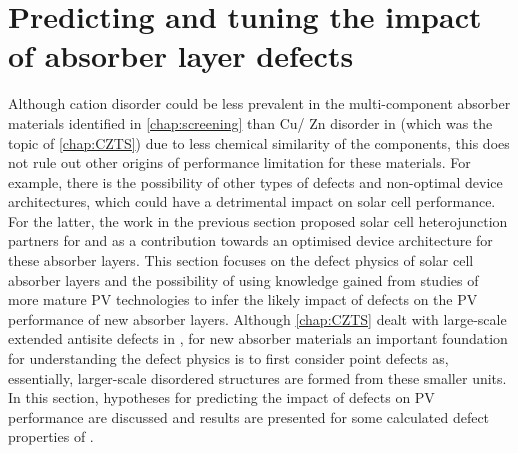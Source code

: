\documentclass[11pt, twoside]{report}
\begin{document}








\section{Predicting and tuning the impact of absorber layer defects}\label{sulfosalt_defects}

Although cation disorder could be less prevalent in the multi-component absorber materials identified in \autoref{chap:screening} than Cu/ Zn disorder in {\CZTS} (which was the topic of \autoref{chap:CZTS}) due to less chemical similarity of the components, this does not rule out other origins of performance limitation for these materials. For example, there is the possibility of other types of defects and non-optimal device architectures, which could have a detrimental impact on solar cell performance. For the latter, the work in the previous section proposed solar cell heterojunction partners for {\enargite} and {\bournonite} as a contribution towards an optimised device architecture for these absorber layers. This section focuses on the defect physics of solar cell absorber layers and the possibility of using knowledge gained from studies of more mature PV technologies to infer the likely impact of defects on the PV performance of new absorber layers. Although \autoref{chap:CZTS} dealt with large-scale extended antisite defects in {\CZTS}, for new absorber materials an important foundation for understanding the defect physics is to first consider point defects as, essentially, larger-scale disordered structures are formed from these smaller units. In this section, hypotheses for predicting the impact of defects on PV performance are discussed and results are presented for some calculated defect properties of {\enargite}.
\end{document}
